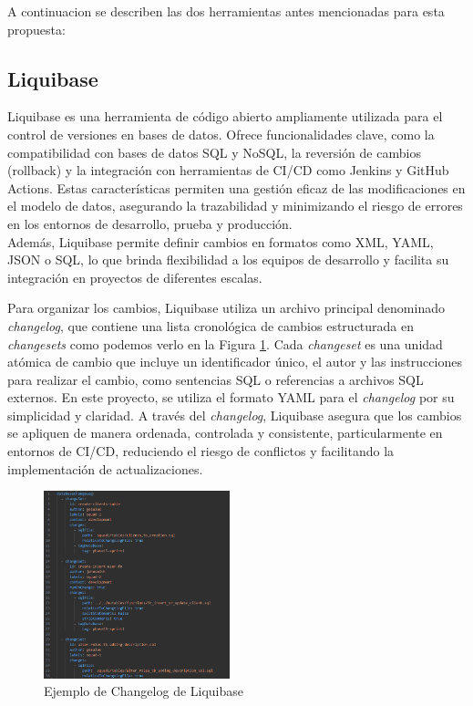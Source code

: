 \documentclass{IEEEtran}
\begin{document}
A continuacion se describen las dos herramientas antes mencionadas para esta propuesta:
\subsection{Liquibase}
Liquibase es una herramienta de código abierto ampliamente utilizada para el control de versiones en bases de datos. Ofrece funcionalidades clave, como la compatibilidad con bases de datos SQL y NoSQL, la reversión de cambios (rollback) y la integración con herramientas de CI/CD como Jenkins y GitHub Actions. Estas características permiten una gestión eficaz de las modificaciones en el modelo de datos, asegurando la trazabilidad y minimizando el riesgo de errores en los entornos de desarrollo, prueba y producción.\\ Además, Liquibase permite definir cambios en formatos como XML, YAML, JSON o SQL, lo que brinda flexibilidad a los equipos de desarrollo y facilita su integración en proyectos de diferentes escalas.

Para organizar los cambios, Liquibase utiliza un archivo principal denominado \textit{changelog}, que contiene una lista cronológica de cambios estructurada en \textit{changesets} como podemos verlo en la Figura \ref{fig:changelogFig}. Cada \textit{changeset} es una unidad atómica de cambio que incluye un identificador único, el autor y las instrucciones para realizar el cambio, como sentencias SQL o referencias a archivos SQL externos. En este proyecto, se utiliza el formato YAML para el \textit{changelog} por su simplicidad y claridad. A través del \textit{changelog}, Liquibase asegura que los cambios se apliquen de manera ordenada, controlada y consistente, particularmente en entornos de CI/CD, reduciendo el riesgo de conflictos y facilitando la implementación de actualizaciones.

\begin{figure}[H]
    \centering
    \includegraphics[width=0.48\textwidth]{images/changelogExample.png}
    \caption{Ejemplo de Changelog de Liquibase}
    \label{fig:changelogFig}
\end{figure}
\end{document}
